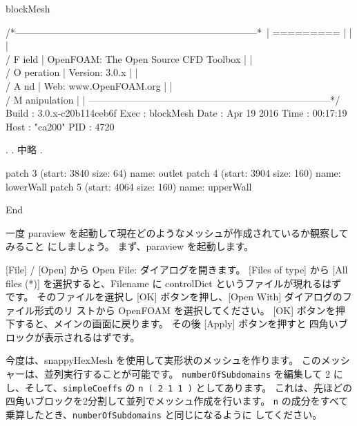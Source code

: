 \documentclass[mingoth,a4paper]{jsarticle}
\begin{document}
\begin{commandline}
blockMesh

/*---------------------------------------------------------------------------*\
| =========                 |                                                 |
| \\      /  F ield         | OpenFOAM: The Open Source CFD Toolbox           |
|  \\    /   O peration     | Version:  3.0.x                                 |
|   \\  /    A nd           | Web:      www.OpenFOAM.org                      |
|    \\/     M anipulation  |                                                 |
\*---------------------------------------------------------------------------*/
Build  : 3.0.x-c20b114ceb6f
Exec   : blockMesh
Date   : Apr 19 2016
Time   : 00:17:19
Host   : "ca200"
PID    : 4720

.
. 中略
.

  patch 3 (start: 3840 size: 64) name: outlet
  patch 4 (start: 3904 size: 160) name: lowerWall
  patch 5 (start: 4064 size: 160) name: upperWall

End
\end{commandline}

一度 paraview を起動して現在どのようなメッシュが作成されているか観察してみること
にしましょう。
まず、paraview を起動します。


[File] / [Open] から Open File: ダイアログを開きます。 [Files of type] から
[All files (*)] を選択すると、Filename に controlDict というファイルが現れるはず
です。
そのファイルを選択し [OK] ボタンを押し、[Open With] ダイアログのファイル形式のリ
ストから OpenFOAM を選択してください。
[OK] ボタンを押下すると、メインの画面に戻ります。
その後 [Apply] ボタンを押すと
四角いブロックが表示されるはずです。

今度は、snappyHexMesh を使用して実形状のメッシュを作ります。
このメッシャーは、並列実行することが可能です。
\verb|numberOfSubdomains| を編集して 2 にし、そして、\verb|simpleCoeffs| の
\verb|n ( 2 1 1 )| としてあります。
これは、先ほどの四角いブロックを2分割して並列でメッシュ作成を行います。
\verb|n| の成分をすべて乗算したとき、\verb|numberOfSubdomains| と同じになるように
してください。
\end{document}

